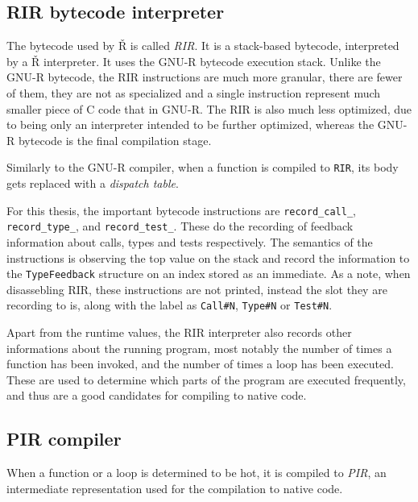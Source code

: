 \subsection{RIR bytecode interpreter}

The bytecode used by Ř is called \textit{RIR}. It is a stack-based bytecode, interpreted by a Ř interpreter. It uses the GNU-R bytecode execution stack. Unlike the GNU-R bytecode, the RIR instructions are much more granular, there are fewer of them, they are not as specialized and a single instruction represent much smaller piece of C code that in GNU-R. The RIR is also much less optimized, due to being only an interpreter intended to be further optimized, whereas the GNU-R bytecode is the final compilation stage.

Similarly to the GNU-R compiler, when a function is compiled to \texttt{RIR}, its body gets replaced with a \textit{dispatch table}.


For this thesis, the important bytecode instructions are \texttt{record\_call\_}, \texttt{record\_type\_}, and \texttt{record\_test\_}. These do the recording of feedback information about calls, types and tests respectively. The semantics of the instructions is observing the top value on the stack and record the information to the \texttt{TypeFeedback} structure on an index stored as an immediate. As a note, when disassebling RIR, these instructions are not printed, instead the slot they are recording to is, along with the label as \texttt{Call\#N}, \texttt{Type\#N} or \texttt{Test\#N}.

Apart from the runtime values, the RIR interpreter also records other informations about the running program, most notably the number of times a function has been invoked, and the number of times a loop has been executed. These are used to determine which parts of the program are executed frequently, and thus are a good candidates for compiling to native code.

\subsection{PIR compiler}
When a function or a loop is determined to be hot, it is compiled to \textit{PIR}, an intermediate representation used for the compilation to native code.

